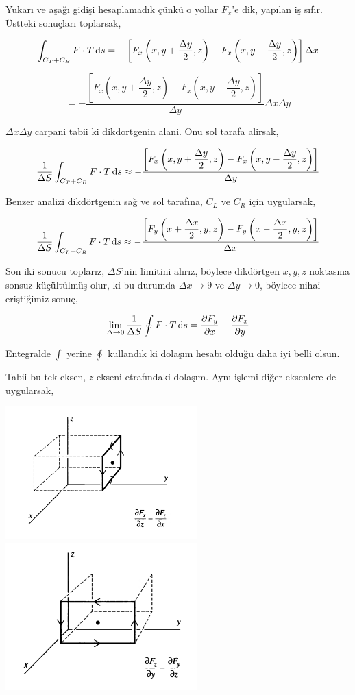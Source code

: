 \documentclass[12pt,fleqn]{article}\usepackage{../../common}
\begin{document}
Yukarı ve aşağı gidişi hesaplamadık çünkü o yollar $F_x$'e dik, yapılan iş
sıfır. Üstteki sonuçları toplarsak,

$$
\int_{C_T+C_B} F \cdot T \,\mathrm{d} s  = - \left[
F_x \left( x,y+\frac{\Delta y}{2},z \right) -
F_x \left( x,y-\frac{\Delta y}{2},z \right)
\right] \Delta x
$$

$$
= - \dfrac{
\left[
  F_x \left( x,y+\dfrac{\Delta y}{2},z \right) -
  F_x \left( x,y-\dfrac{\Delta y}{2},z \right)
\right]  
}{\Delta y}
\Delta x \Delta y
$$

$\Delta x \Delta y$ carpani tabii ki dikdortgenin alani. Onu sol tarafa alirsak,

$$
\frac{1}{\Delta S}\int_{C_T+C_B} F \cdot T \,\mathrm{d} s \approx
- \dfrac{
\left[
  F_x \left( x,y+\dfrac{\Delta y}{2},z \right) -
  F_x \left( x,y-\dfrac{\Delta y}{2},z \right)
\right]  
}{\Delta y}
$$

Benzer analizi dikdörtgenin sağ ve sol tarafına, $C_L$ ve $C_R$ için uygularsak,

$$
\frac{1}{\Delta S}\int_{C_L+C_R} F \cdot T \,\mathrm{d} s \approx
- \dfrac{
\left[
  F_y \left( x+\dfrac{\Delta x}{2},y,z \right) -
  F_y \left( x-\dfrac{\Delta x}{2},y,z \right)
\right]  
}{\Delta x}
$$

Son iki sonucu toplarız, $\Delta S$'nin limitini alırız, böylece dikdörtgen
$x,y,z$ noktasına sonsuz küçültülmüş olur, ki bu durumda $\Delta x \to 9$ ve
$\Delta y \to 0$, böylece nihai eriştiğimiz sonuç,

$$
\lim_{\Delta \to 0} \frac{1}{\Delta S} \oint F \cdot T \,\mathrm{d} s =
\frac{\partial F_y}{\partial x} - \frac{\partial F_x}{\partial y}
$$

Entegralde $\int$ yerine $\oint$ kullandık ki dolaşım hesabı olduğu daha iyi
belli olsun.

Tabii bu tek eksen, $z$ ekseni etrafındaki dolaşım. Aynı işlemi diğer eksenlere
de uygularsak,

\includegraphics[width=20em]{calc_multi_70_div_curl_lap_09.png}
\includegraphics[width=20em]{calc_multi_70_div_curl_lap_10.png}
\end{document}
